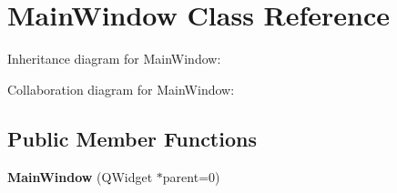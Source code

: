 \hypertarget{classMainWindow}{}\section{Main\+Window Class Reference}
\label{classMainWindow}


Inheritance diagram for Main\+Window\+:


Collaboration diagram for Main\+Window\+:
\subsection*{Public Member Functions}
\begin{DoxyCompactItemize}
\item 
{\bfseries Main\+Window} (Q\+Widget $\ast$parent=0)\hypertarget{classMainWindow_a8b244be8b7b7db1b08de2a2acb9409db}{}\label{classMainWindow_a8b244be8b7b7db1b08de2a2acb9409db}


\end{DoxyCompactItemize}
